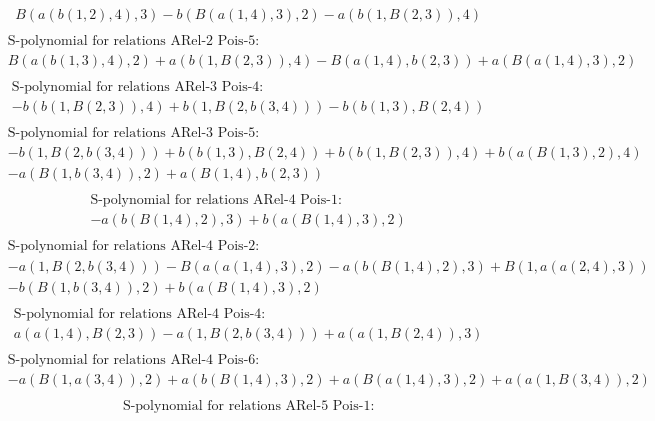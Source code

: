 \documentclass[11pt]{amsart}
\begin{document}
\begin{align*}
&B(a(b(1,2),4),3) - b(B(a(1,4),3),2) - a(b(1,B(2,3)),4) \\ 
\end{align*}\begin{align*} 
& \text{S-polynomial for relations ARel-2 Pois-5:} \\ 
&B(a(b(1,3),4),2) + a(b(1,B(2,3)),4) - B(a(1,4),b(2,3)) + a(B(a(1,4),3),2) \\ 
\end{align*}\begin{align*} 
& \text{S-polynomial for relations ARel-3 Pois-4:} \\ 
& - b(b(1,B(2,3)),4) + b(1,B(2,b(3,4))) - b(b(1,3),B(2,4)) \\ 
\end{align*}\begin{align*} 
& \text{S-polynomial for relations ARel-3 Pois-5:} \\ 
& - b(1,B(2,b(3,4))) + b(b(1,3),B(2,4)) + b(b(1,B(2,3)),4) + b(a(B(1,3),2),4)\\ 
 &  - a(B(1,b(3,4)),2) + a(B(1,4),b(2,3)) \\ 
\end{align*}\begin{align*} 
& \text{S-polynomial for relations ARel-4 Pois-1:} \\ 
& - a(b(B(1,4),2),3) + b(a(B(1,4),3),2) \\ 
\end{align*}\begin{align*} 
& \text{S-polynomial for relations ARel-4 Pois-2:} \\ 
& - a(1,B(2,b(3,4))) - B(a(a(1,4),3),2) - a(b(B(1,4),2),3) + B(1,a(a(2,4),3))\\ 
 &  - b(B(1,b(3,4)),2) + b(a(B(1,4),3),2) \\ 
\end{align*}\begin{align*} 
& \text{S-polynomial for relations ARel-4 Pois-4:} \\ 
&a(a(1,4),B(2,3)) - a(1,B(2,b(3,4))) + a(a(1,B(2,4)),3) \\ 
\end{align*}\begin{align*} 
& \text{S-polynomial for relations ARel-4 Pois-6:} \\ 
& - a(B(1,a(3,4)),2) + a(b(B(1,4),3),2) + a(B(a(1,4),3),2) + a(a(1,B(3,4)),2) \\ 
\end{align*}\begin{align*} 
& \text{S-polynomial for relations ARel-5 Pois-1:} \\ 

\end{align*}
\end{document}
